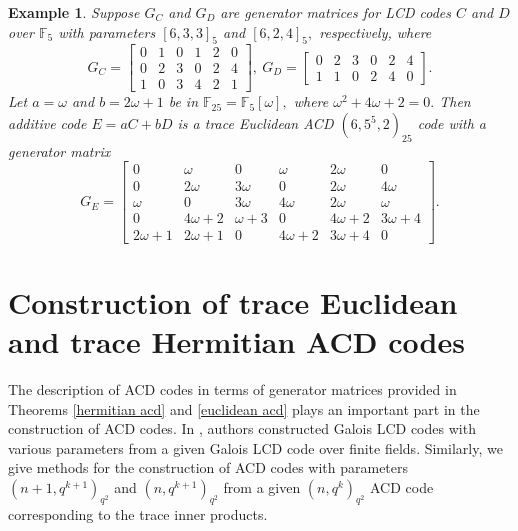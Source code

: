 \documentclass[sn-mathphys-num]{sn-jnl}%
\theoremstyle{thmstyleone}%
\theoremstyle{thmstyletwo}%
\newtheorem{example}{Example}%
\theoremstyle{thmstylethree}%
\begin{document}
\begin{example}
	Suppose $G_C$ and $G_D$ are generator matrices for LCD codes $C$ and $D$ over $\mathbb{F}_5$ with parameters $[6,3,3]_5$ and $[6,2,4]_5,$ respectively, where 
	$$G_C=\begin{bmatrix}
		0&1&0&1&2&0\\
		0&2&3&0&2&4\\
		1&0&3&4&2&1
	\end{bmatrix},\ G_D=\begin{bmatrix}
		0&2&3&0&2&4\\
		1&1&0&2&4&0
	\end{bmatrix}.$$
	Let $a=\omega $ and $b=2\omega +1$ be in $\mathbb{F}_{25}=\mathbb{F}_5[\omega],$ where $\omega^2+4\omega+2=0.$ Then additive code $E=aC+bD$ is a trace Euclidean ACD $(6,5^5,2)_{25}$ code  with a generator matrix
	$$G_E=\begin{bmatrix}
		0 &\omega &0 &\omega & 2\omega& 0\\
		0& 2 \omega &3\omega &0&2\omega &4\omega\\
		\omega &0&3\omega&4\omega& 2\omega&\omega\\
		0&4\omega+2&\omega+3&0&4\omega+2&3\omega+4\\
		2\omega+1&2\omega+1&0&4\omega+2&3\omega+4&0
	\end{bmatrix}.$$
\end{example}

\section{Construction of trace Euclidean and trace Hermitian ACD codes}\label{construction acd}
The description of ACD codes in terms of generator matrices provided in Theorems \ref{hermitian acd} and \ref{euclidean acd} plays an important part in the construction of ACD codes. In \cite{verma2023}, authors constructed Galois LCD codes with various parameters from a given Galois LCD code over finite fields. Similarly,  we give methods for the construction of ACD codes with  parameters $(n+1,q^{k+1})_{q^2}$ and $(n,q^{k+1})_{q^2}$  from a given  $(n,q^k)_{q^2}$ ACD code corresponding to the trace inner products. 
\end{document}
